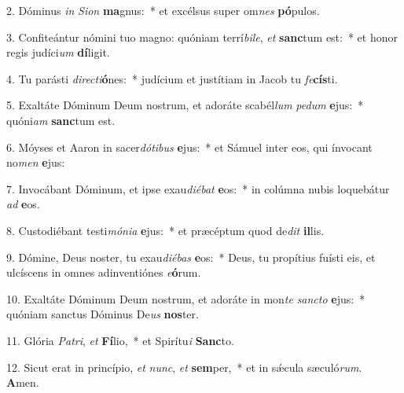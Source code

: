 2. Dóminus \textit{in} \textit{Si}\textit{on} \textbf{ma}gnus:~*  et excélsus super om\textit{nes} \textbf{pó}pulos.\

3. Confiteántur nómini tuo magno: quóniam terrí\textit{bi}\textit{le}, \textit{et} \textbf{sanc}tum est:~*  et honor regis judíci\textit{um} \textbf{dí}ligit.\

4. Tu parásti \textit{di}\textit{rec}\textit{ti}\textbf{ó}nes:~*  judícium et justítiam in Jacob tu \textit{fe}\textbf{cís}ti.\

5. Exaltáte Dóminum Deum nostrum, et adoráte scabél\textit{lum} \textit{pe}\textit{dum} \textbf{e}jus:~*  quóni\textit{am} \textbf{sanc}tum est.\

6. Móyses et Aaron in sacer\textit{dó}\textit{ti}\textit{bus} \textbf{e}jus:~*  et Sámuel inter eos, qui ínvocant no\textit{men} \textbf{e}jus:\

7. Invocábant Dóminum, et ipse exau\textit{di}\textit{é}\textit{bat} \textbf{e}os:~*  in colúmna nubis loquebátur \textit{ad} \textbf{e}os.\

8. Custodiébant testi\textit{mó}\textit{ni}\textit{a} \textbf{e}jus:~*  et præcéptum quod de\textit{dit} \textbf{il}lis.\

9. Dómine, Deus noster, tu exau\textit{di}\textit{é}\textit{bas} \textbf{e}os:~*  Deus, tu propítius fuísti eis, et ulcíscens in omnes adinventiónes \textit{e}\textbf{ó}rum.\

10. Exaltáte Dóminum Deum nostrum, et adoráte in mon\textit{te} \textit{sanc}\textit{to} \textbf{e}jus:~*  quóniam sanctus Dóminus De\textit{us} \textbf{nos}ter.\

11. Glória \textit{Pa}\textit{tri}, \textit{et} \textbf{Fí}lio,~*  et Spirítu\textit{i} \textbf{Sanc}to.\

12. Sicut erat in princípio, \textit{et} \textit{nunc}, \textit{et} \textbf{sem}per,~*  et in sǽcula sæculó\textit{rum}. \textbf{A}men.\

